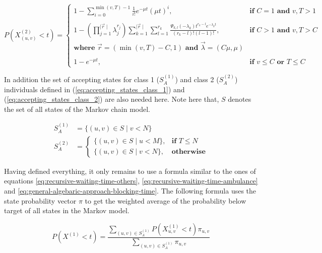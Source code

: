 \begin{equation}
    P(X_{(u,v)}^{(2)} < t) = 
    \begin{cases}
        1 - \sum_{i=0}^{\min(v,T)-1} \frac{1}{i!} e^{-\mu t} (\mu t)^i,  
            & \textbf{if } C = 1 \textbf{ and } v, T > 1 \\
        & \\
        1 - \left( \prod_{j=1}^{\mid \vec{r} \mid} \lambda_j^{r_j} \right) 
            \sum_{k=1}^{\mid \vec{r} \mid} \sum_{l=1}^{r_k}
            \frac{\Psi_{k,l}(-\lambda_k)t^{r_k - l} 
            e^{-\lambda_k t}}{(r_k - l)! (l - 1)!}, 
            & \textbf{if } C > 1 \textbf{ and } v, T  > C \\
        \textbf{where } \vec{r}=(\min(v, T) - C, 1) \textbf{ and } 
            \vec{\lambda}=(C \mu, \mu) & \\
        & \\
        1 - e^{-\mu t}, & \textbf{if } v \leq C \textbf{ or } T \leq C
    \end{cases}
\end{equation}


In addition the set of accepting states for class 1 (\(S_A^{(1)}\)) and class 2 
(\(S_A^{(2)}\)) individuals defined in  (\ref{eq:accepting_states_class_1}) and 
(\ref{eq:accepting_states_class_2}) are also needed here.
Note here that, \(S\) denotes the set of all states of the Markov chain model. 

\begin{align*}
    S_A^{(1)} &= \{(u, v) \in S \; | \; v < N \} \\
    S_A^{(2)} &=
    \begin{cases}
        \{(u, v) \in S \; | \; u < M \}, & \textbf{if } T \leq N \\
        \{(u, v) \in S \; | \; v < N \}, & \textbf{otherwise}
    \end{cases}
\end{align*}

Having defined everything, it only remains to use a formula similar to the ones 
of equations \ref{eq:recursive-waiting-time-others}, 
\ref{eq:recursive-waiting-time-ambulance} and 
\ref{eq:general-algebaric-approach-blocking-time}.
The following formula uses the state probability vector \(\pi\) to get the 
weighted average of the probability below target of all states in the Markov
model.

\begin{equation}
    P(X^{(1)} < t) = \frac{\sum_{(u,v) \in S_A^{(1)}} P(X_{u,v}^{(1)} < t) 
    \pi_{u,v} }{\sum_{(u,v) \in S_A^{(1)}} \pi_{u,v}}
\end{equation}

